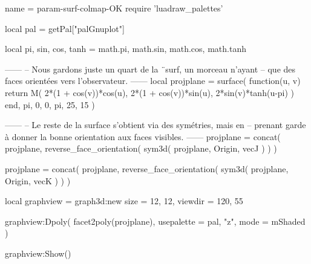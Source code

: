 \documentclass{standalone}
\begin{document}
\begin{luadraw}{name = param-surf-colmap-OK}
require 'luadraw_palettes'

local pal = getPal["palGnuplot"]

local pi, sin, cos, tanh = math.pi, math.sin, math.cos, math.tanh

------
-- Nous gardons juste un quart de la ¨surf, un morceau n'ayant
-- que des faces orientées vers l'observateur.
------
local projplane = surface(
  function(u, v)
    return M(
      2*(1 + cos(v))*cos(u),
      2*(1 + cos(v))*sin(u),
      2*sin(v)*tanh(u-pi)
    )
  end,
  pi, 0, 0, pi,
  {25, 15}
)

------
-- Le reste de la surface s'obtient via des symétries, mais en
-- prenant garde à donner la bonne orientation aux faces visibles.
------
projplane = concat(
  projplane,
  reverse_face_orientation(
    sym3d(
      projplane,
      {Origin, vecJ}
    )
  )
)

projplane = concat(
  projplane,
  reverse_face_orientation(
    sym3d(
      projplane,
      {Origin, vecK}
    )
  )
)

local graphview = graph3d:new{
  size    = {12, 12},
  viewdir = {120, 55}
}

graphview:Dpoly(
  facet2poly(projplane), 
  {
    usepalette = {pal, "z"},
    mode       = mShaded
  }
)

graphview:Show()
\end{luadraw}
\end{document}
